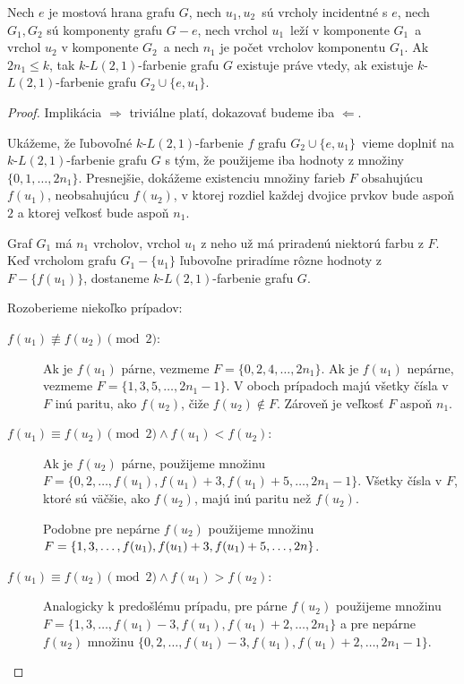 \begin{lema}
    \label{pseudoblok-prune}
    Nech $e$ je mostová hrana grafu $G$, nech $u_1, u_2$ sú vrcholy incidentné s $e$,
    nech $G_1, G_2$ sú komponenty grafu $G - e$, nech vrchol $u_1$ leží v komponente $G_1$ a vrchol $u_2$
    v komponente $G_2$ a
    nech $n_1$ je počet vrcholov komponentu $G_1$. Ak $2n_1 \leq k$, tak $k$-$L(2,1)$-farbenie
    grafu $G$ existuje práve vtedy, ak existuje $k$-$L(2,1)$-farbenie grafu $G_2 \cup \{e, u_1\}$.
\end{lema}

\begin{proof}
    Implikácia $\boxed{\Rightarrow}$ triviálne platí, dokazovať budeme iba $\boxed{\Leftarrow}$.

    Ukážeme, že ľubovoľné $k$-$L(2,1)$-farbenie $f$ grafu $G_2 \cup \{e, u_1\}$ vieme doplniť na
    $k$-$L(2,1)$-farbenie grafu $G$ s tým, že použijeme iba hodnoty z množiny $\{0, 1, \ldots, 2n_1\}$.
    Presnejšie, dokážeme existenciu množiny farieb $F$ obsahujúcu $f(u_1)$, neobsahujúcu $f(u_2)$,
    v ktorej rozdiel každej dvojice prvkov bude aspoň $2$ a ktorej veľkosť bude aspoň $n_1$.
    
    Graf $G_1$ má $n_1$ vrcholov, vrchol $u_1$ z neho už má priradenú niektorú farbu z $F$. Keď vrcholom
    grafu $G_1 - \{u_1\}$ ľubovoľne priradíme rôzne hodnoty z $F - \{f(u_1)\}$, dostaneme $k$-$L(2,1)$-farbenie
    grafu $G$.

    Rozoberieme niekoľko prípadov:

    \begin{description}
        \item[$\boxed{f(u_1) \not\equiv f(u_2) \pmod{2}}:$] 
            Ak je $f(u_1)$ párne, vezmeme $F = \{0, 2, 4, \ldots, 2n_1\}$.
            Ak je $f(u_1)$ nepárne, vezmeme $F = \{1, 3, 5, \ldots, 2n_1 - 1\}$. V oboch prípadoch majú všetky
            čísla v $F$ inú paritu, ako $f(u_2)$, čiže $f(u_2) \notin F$. Zároveň je veľkosť $F$ aspoň $n_1$.

        \item[$\boxed{f(u_1) \equiv f(u_2) \pmod{2} \wedge f(u_1) < f(u_2)}:$]
            Ak je $f(u_2)$ párne, použijeme množinu
            $F = \{0, 2, \ldots, f(u_1), f(u_1) + 3, f(u_1) + 5, \ldots, 2n_1 - 1\}$. Všetky čísla v $F$, ktoré sú
            väčšie, ako $f(u_2)$, majú inú paritu než $f(u_2)$.

            Podobne pre nepárne $f(u_2)$ použijeme množinu $F = \{1, 3, \ldots, f(u_1), f(u_1) + 3, \\ f(u_1) + 5, \ldots, 2n\}$.

        \item[$\boxed{f(u_1) \equiv f(u_2) \pmod{2} \wedge f(u_1) > f(u_2)}:$]
            Analogicky k predošlému prípadu, pre párne $f(u_2)$ použijeme množinu $F = \{1, 3, \ldots, f(u_1) - 3, f(u_1), f(u_1) + 2, \ldots, 2n_1\}$
            a pre nepárne $f(u_2)$ množinu $\{0, 2, \ldots, f(u_1) - 3, f(u_1), f(u_1) + 2, \ldots, 2n_1 - 1\}$. \qedhere
    \end{description}
\end{proof}

